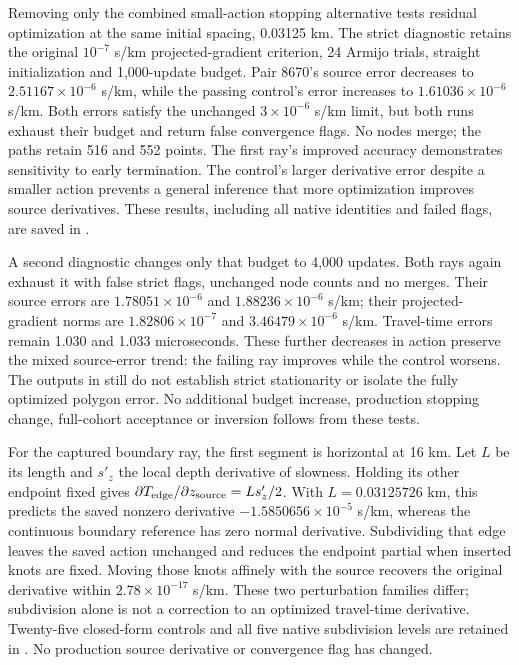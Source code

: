 Removing only the combined small-action stopping alternative tests residual
optimization at the same initial spacing, 0.03125 km. The strict diagnostic
retains the original $10^{-7}$ s/km projected-gradient criterion, 24 Armijo
trials, straight initialization and 1,000-update budget. Pair 8670's source
error decreases to $2.51167\times10^{-6}$ s/km, while the passing control's
error increases to $1.61036\times10^{-6}$ s/km. Both errors satisfy the
unchanged $3\times10^{-6}$ s/km limit, but both runs exhaust their budget and
return false convergence flags. No nodes merge; the paths retain 516 and
552 points. The first ray's improved accuracy demonstrates sensitivity to
early termination. The control's larger derivative error despite a smaller
action prevents a general inference that more optimization improves source
derivatives. These results, including all native identities and failed flags,
are saved in .

A second diagnostic changes only that budget to 4,000 updates. Both rays
again exhaust it with false strict flags, unchanged node counts and no merges.
Their source errors are $1.78051\times10^{-6}$ and $1.88236\times10^{-6}$ s/km;
their projected-gradient norms are $1.82806\times10^{-7}$ and
$3.46479\times10^{-6}$ s/km. Travel-time errors remain 1.030 and
1.033 microseconds. These further decreases in action preserve the mixed
source-error trend: the failing ray improves while the control worsens.
The outputs in
still do not establish strict stationarity or isolate the fully optimized
polygon error. No additional budget increase, production stopping change,
full-cohort acceptance or inversion follows from these tests.

For the captured boundary ray, the first segment is horizontal at 16 km.
Let $L$ be its length and $s'_z$ the local depth derivative of slowness.
Holding its other endpoint fixed gives
$\partial T_{\rm edge}/\partial z_{\rm source}=L s'_z/2$.
With $L=0.03125726$ km, this predicts the saved nonzero derivative
$-1.5850656\times10^{-5}$ s/km, whereas the continuous boundary reference
has zero normal derivative. Subdividing that edge leaves the saved action
unchanged and reduces the endpoint partial when inserted knots are fixed.
Moving those knots affinely with the source recovers the original derivative
within $2.78\times10^{-17}$ s/km. These two perturbation families differ;
subdivision alone is not a correction to an optimized travel-time derivative.
Twenty-five closed-form controls and all five native subdivision levels are
retained in .
No production source derivative or convergence flag has changed.

